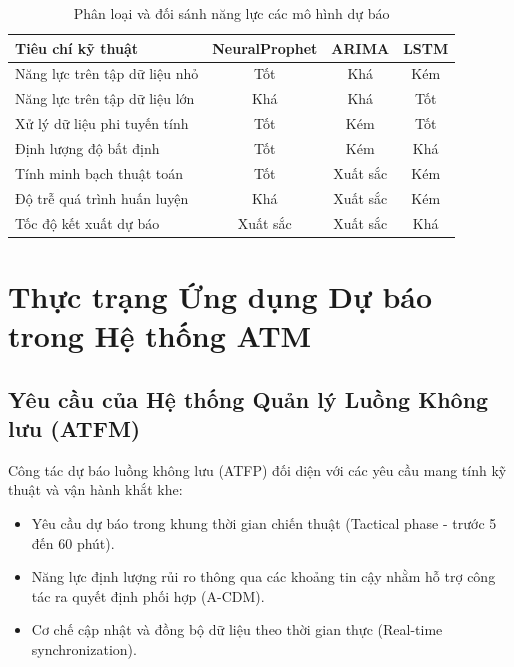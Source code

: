 \documentclass[12pt,a4paper]{article}
\begin{document}
\begin{table}[htbp]
\centering
\caption{Phân loại và đối sánh năng lực các mô hình dự báo}
\label{tab:benchmark_summary}
\begin{tabular}{|l|c|c|c|}
\hline
\textbf{Tiêu chí kỹ thuật} & \textbf{NeuralProphet} & \textbf{ARIMA} & \textbf{LSTM} \\
\hline
Năng lực trên tập dữ liệu nhỏ & Tốt & Khá & Kém \\
Năng lực trên tập dữ liệu lớn & Khá & Khá & Tốt \\
Xử lý dữ liệu phi tuyến tính & Tốt & Kém & Tốt \\
Định lượng độ bất định & Tốt & Kém & Khá \\
Tính minh bạch thuật toán & Tốt & Xuất sắc & Kém \\
Độ trễ quá trình huấn luyện & Khá & Xuất sắc & Kém \\
Tốc độ kết xuất dự báo & Xuất sắc & Xuất sắc & Khá \\
\hline
\end{tabular}
\end{table}


\section{Thực trạng Ứng dụng Dự báo trong Hệ thống ATM}

\subsection{Yêu cầu của Hệ thống Quản lý Luồng Không lưu (ATFM)}

Công tác dự báo luồng không lưu (ATFP) đối diện với các yêu cầu mang tính kỹ thuật và vận hành khắt khe:
\begin{itemize}
    \item Yêu cầu dự báo trong khung thời gian chiến thuật (Tactical phase - trước 5 đến 60 phút).
    \item Năng lực định lượng rủi ro thông qua các khoảng tin cậy nhằm hỗ trợ công tác ra quyết định phối hợp (A-CDM).
    \item Cơ chế cập nhật và đồng bộ dữ liệu theo thời gian thực (Real-time synchronization).
\end{itemize}
\end{document}
